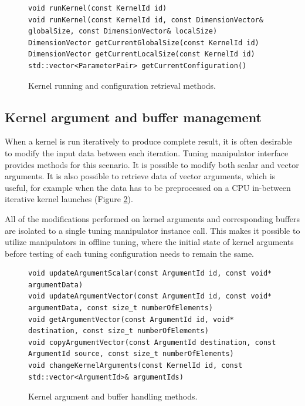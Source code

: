 \documentclass
[
    digital, %
    oneside, %
    table, %
    nolof, %
    nolot, %
    nocover %
]{fithesis3}
\begin{document}
\begin{figure}
\begin{adjustwidth}{-1cm}{-1cm}
\begin{lstlisting}
void runKernel(const KernelId id)
void runKernel(const KernelId id, const DimensionVector& globalSize, const DimensionVector& localSize)
DimensionVector getCurrentGlobalSize(const KernelId id)
DimensionVector getCurrentLocalSize(const KernelId id)
std::vector<ParameterPair> getCurrentConfiguration()
\end{lstlisting}
\caption{Kernel running and configuration retrieval methods.}
\label{ktt-manipulator-kernel-methods}
\end{adjustwidth}
\end{figure}

\subsection{Kernel argument and buffer management}
When a kernel is run iteratively to produce complete result, it is often desirable to modify the input data between each iteration. Tuning manipulator
interface provides methods for this scenario. It is possible to modify both scalar and vector arguments. It is also possible to retrieve data of
vector arguments, which is useful, for example when the data has to be preprocessed on a CPU in-between iterative kernel launches (Figure
\ref{ktt-manipulator-buffer-methods}).

All of the modifications performed on kernel arguments and corresponding buffers are isolated to a single tuning manipulator instance call. This makes
it possible to utilize manipulators in offline tuning, where the initial state of kernel arguments before testing of each tuning configuration needs to
remain the same.

\begin{figure}
\begin{adjustwidth}{-1cm}{-1cm}
\begin{lstlisting}
void updateArgumentScalar(const ArgumentId id, const void* argumentData)
void updateArgumentVector(const ArgumentId id, const void* argumentData, const size_t numberOfElements)
void getArgumentVector(const ArgumentId id, void* destination, const size_t numberOfElements)
void copyArgumentVector(const ArgumentId destination, const ArgumentId source, const size_t numberOfElements)
void changeKernelArguments(const KernelId id, const std::vector<ArgumentId>& argumentIds)
\end{lstlisting}
\caption{Kernel argument and buffer handling methods.}
\label{ktt-manipulator-buffer-methods}
\end{adjustwidth}
\end{figure}
\end{document}
